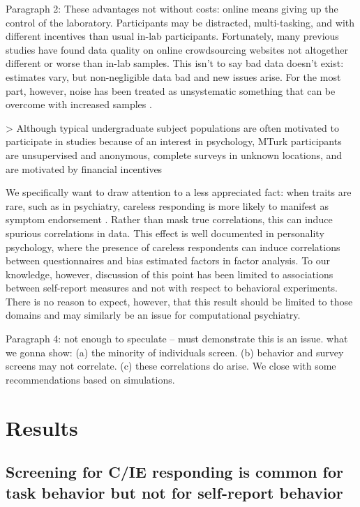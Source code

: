 \documentclass[a4paper,notitlepage,12pt]{article}
\begin{document}
Paragraph 2: These advantages not without costs: online means giving up the control of the laboratory. Participants may be distracted, multi-tasking, and with different incentives than usual in-lab participants. Fortunately, many previous studies have found data quality on online crowdsourcing websites not altogether different or worse than in-lab samples. This isn't to say bad data doesn't exist: estimates vary, but non-negligible data bad and new issues arise. For the most part, however, noise has been treated as unsystematic something that can be overcome with increased samples  \cite{gillan2016taking, chandler2020participant}. 

> Although typical undergraduate subject populations are often motivated to participate in studies because of an interest in psychology, MTurk participants are unsupervised and anonymous, complete surveys in unknown locations, and are motivated by financial incentives

We specifically want to draw attention to a less appreciated fact: when traits are rare, such as in psychiatry, careless responding is more likely to manifest as symptom endorsement \cite{chandler2020participant, ophir2020turker}. Rather than mask true correlations, this can induce spurious correlations in data. This effect is well documented in personality psychology, where the presence of careless respondents can induce correlations between questionnaires and bias estimated factors in factor analysis. To our knowledge, however, discussion of this point has been limited to associations between self-report measures and not with respect to behavioral experiments. There is no reason to expect, however, that this result should be limited to those domains and may similarly be an issue for computational psychiatry.

Paragraph 4: not enough to speculate -- must demonstrate this is an issue. what we gonna show: (a) the minority of individuals screen. (b) behavior and survey screens may not correlate. (c) these correlations do arise. We close with some recommendations based on simulations. 

\section{Results}

\subsection{Screening for C/IE responding is common for task behavior but not for self-report behavior}
\end{document}
